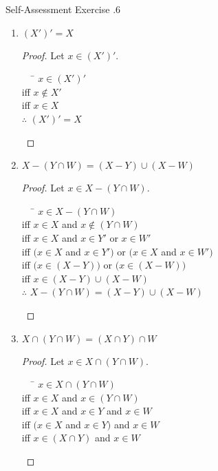 \documentclass[../notes.tex]{subfiles}
\begin{document}
			\begin{exercise}{Self-Assessment Exercise \thechapter.6}
				\begin{multicols}{2}
					\begin{enumerate}[label=(\alph*), itemsep=0.5em]
						\item $(X')' = X$
							\begin{proof}
								Let $x \in (X')'$.
								\begin{tabbing}
									$\quad$ \= $x \in (X')'$\\
									iff \> $x \notin X'$\\
									iff \> $x \in X$\\
									$\therefore$ \> $(X')' = X$
								\end{tabbing}
							\end{proof}
						\item $X - (Y \cap W) = (X - Y) \cup (X - W)$
							\begin{proof}
								Let $x \in X - (Y \cap W)$.
								\begin{tabbing}
									$\quad$ \= $x \in X - (Y \cap W)$\\
									iff \> $x \in X$ and $x \notin (Y \cap W)$\\
									iff \> $x \in X$ and $x \in Y'$ or $x \in W'$\\
									iff \> $\bigl(x \in X$ and $x \in Y'\bigr)$ or $\bigl(x \in X$ and $x \in W'\bigr)$\\
									iff \> $\bigl(x \in (X - Y)\bigr)$ or $\bigl(x \in (X - W)\bigr)$\\
									iff \> $x \in (X - Y) \cup (X - W)$\\
									$\therefore$ \> $X - (Y \cap W) = (X - Y) \cup (X - W)$
								\end{tabbing}
							\end{proof}
						\columnbreak
						\item $X \cap (Y \cap W) = (X \cap Y) \cap W$
							\begin{proof}
								Let $x \in X \cap (Y \cap W)$.
								\begin{tabbing}
									$\quad$ \= $x \in X \cap (Y \cap W)$\\
									iff \> $x \in X$ and $x \in (Y \cap W)$\\
									iff \> $x \in X$ and $x \in Y$ and $x \in W$\\
									iff \> $(x \in X$ and $x \in Y)$ and $x \in W$\\
									iff \> $x \in (X \cap Y)$ and $x \in W$\\

\end{tabbing}
\end{proof}
\end{enumerate}
\end{multicols}
\end{exercise}
\end{document}

